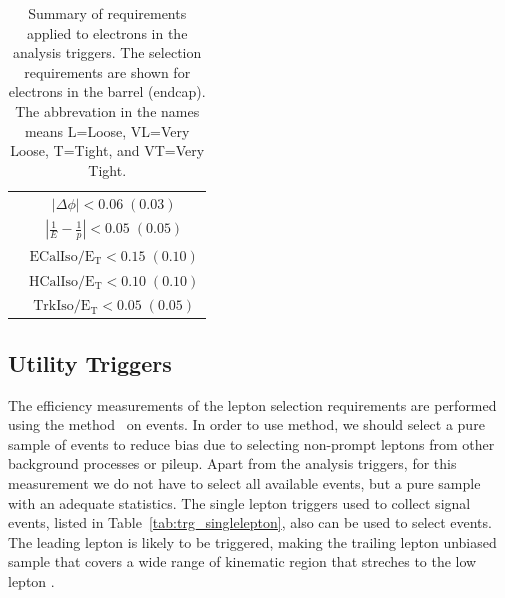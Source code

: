 \begin{table}[!ht]
\begin{tabular}{l|c}
                               	& $|\Delta\phi|\mathrm{< 0.06\;(0.03)}$  \\
                               	& $|\frac{1}{E}-\frac{1}{p}|\mathrm{< 0.05\;(0.05)}$  \\
    							& $\mathrm{ECalIso/E_T <0.15\;(0.10)}$ \\
                                & $\mathrm{HCalIso/E_T <0.10\;(0.10)}$ \\
                       			& $\mathrm{TrkIso/E_T <0.05\;(0.05)}$\\
    \hline
 \end{tabular}
 \caption{Summary of requirements applied to electrons in the analysis triggers.
The selection requirements are shown for electrons in the barrel (endcap).
The abbrevation in the names means L=Loose, VL=Very Loose, T=Tight, and VT=Very Tight.}
 \label{tab:trg_requirement_def}
\end{table}

\subsection{Utility Triggers}

The efficiency measurements of the lepton selection requirements 
are performed using the \tnp{} method~\cite{} on \dyll{} events. 
In order to use \tnp{} method, we should select a pure sample 
of \dyll{} events to reduce bias due to selecting non-prompt leptons from 
other background processes or pileup. Apart from the analysis triggers, for this 
measurement we do not have to select all available events, but a pure sample with 
an adequate statistics. The single lepton triggers used to collect signal events, 
listed in Table~\ref{tab:trg_singlelepton}, also can be used to select 
\dyll{} events. The leading lepton is likely to be triggered, making the 
trailing lepton unbiased sample that covers a wide range of 
kinematic region that streches to the low lepton \pt.   

